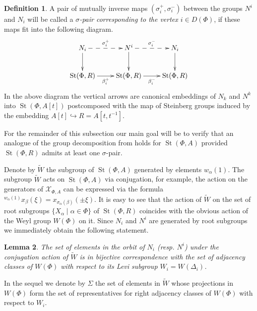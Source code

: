 \documentclass[oneside, 10pt]{amsart}
\DeclareMathOperator{\St}{St}
\DeclareMathOperator{\GL}{GL}
\numberwithin{equation}{section}
\newtheorem{lemma}{Lemma}
\numberwithin{lemma}{section}
\theoremstyle{definition}
\newtheorem{dfn}[lemma]{Definition}
\theoremstyle{remark}
\begin{document}
\begin{dfn} A pair of mutually inverse maps $(\sigma_i^+, \sigma_i^-)$ between the groups $N^i$ and $N_i$ will be called a {\it $\sigma$-pair corresponding to the vertex $i\in D(\Phi)$},
 if these maps fit into the following diagram.
\begin{equation} \label{eq:sigma-diagram}
\xymatrix{ N_i\ar@{-->}[r]^{\sigma_i^+}\ar[d] & N^i \ar[d] \ar@{-->}[r]^{\sigma_i^-} & N_i \ar[d] \\ 
          \St(\Phi, R) \ar@<-0.0ex>[r]_{\beta_i^+} & \St(\Phi, R) \ar@<-0.0ex>[r]_{\beta_i^-} & \St(\Phi, R)} 
\end{equation}
In the above diagram the vertical arrows are canonical embeddings of $N_k$ and $N^k$ into $\St(\Phi, A[t])$ postcomposed with 
 the map of Steinberg groups induced by the embedding $A[t] \hookrightarrow R = A[t, t^{-1}]$.
\end{dfn}

For the remainder of this subsection our main goal will be to verify that an analogue of the group decomposition from \cite[Lemma~3.1f]{Tu83} holds for $\St(\Phi, A)$
 provided $\St(\Phi, R)$ admits at least one $\sigma$-pair.

Denote by $\widetilde{W}$ the subgroup of $\St(\Phi, A)$ generated by elements $w_\alpha(1)$.
The subgroup $\widetilde{W}$ acts on $\St(\Phi, A)$ via conjugation, for example, 
 the action on the generators of $\mathcal{X}_{\Phi, A}$ can be expressed via the formula ${}^{w_\alpha(1)} \!x_{\beta}(\xi) = x_{\sigma_{\alpha}(\beta)} ( \pm \xi)$.
It is easy to see that the action of $\widetilde{W}$ on the set of root subgroups $\{X_\alpha \mid \alpha \in \Phi \}$ of $\St(\Phi, R)$ coincides with the obvious
 action of the Weyl group $W(\Phi)$ on it. Since $N_i$ and $N^i$ are generated by root subgroups we immediately obtain the following statement.
\begin{lemma} The set of elements in the orbit of $N_i$ (resp. $N^i$) under the conjugation action of $\widetilde{W}$ 
is in bijective correspondence with 
the set of adjacency classes of $W(\Phi)$ with respect to its Levi subgroup $W_i = W(\Delta_i)$. %
\end{lemma}
In the sequel we denote by $\Sigma$ the set of elements in $\widetilde{W}$ whose projections in $W(\Phi)$ form the set of representatives for
 right adjacency classes of $W(\Phi)$ with respect to $W_i$. %
\end{document}
